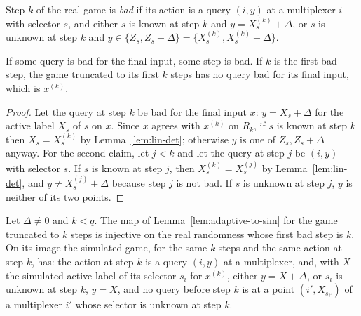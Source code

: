 \begin{definition}
  \label{def:adaptive-bad}
  \leanok
  Step $k$ of the real game is \emph{bad} if its action is a query $(i, y)$ at a multiplexer $i$
  with selector $s$, and either $s$ is known at step $k$ and $y = X^{(k)}_s + \Delta$, or $s$ is
  unknown at step $k$ and $y \in \{Z_s, Z_s + \Delta\} = \{X^{(k)}_s, X^{(k)}_s + \Delta\}$.
\end{definition}

\begin{lemma}
  \label{lem:adaptive-first-bad}
  \leanok
  If some query is bad for the final input, some step is bad. If $k$ is the first bad step, the game
  truncated to its first $k$ steps has no query bad for its final input, which is $x^{(k)}$.
\end{lemma}

\begin{proof}
  \leanok
  Let the query at step $k$ be bad for the final input $x$: $y = X_s + \Delta$ for the active label
  $X_s$ of $s$ on $x$. Since $x$ agrees with $x^{(k)}$ on $R_k$, if $s$ is known at step $k$ then
  $X_s = X^{(k)}_s$ by Lemma~\ref{lem:lin-det}; otherwise $y$ is one of $Z_s, Z_s + \Delta$ anyway.
  For the second claim, let $j < k$ and let the query at step $j$ be $(i, y)$ with selector $s$.
  If $s$ is known at step $j$, then $X^{(k)}_s = X^{(j)}_s$ by Lemma~\ref{lem:lin-det}, and $y \ne
  X^{(j)}_s + \Delta$ because step $j$ is not bad. If $s$ is unknown at step $j$, $y$ is neither of
  its two points.
\end{proof}

\begin{lemma}
  \label{lem:adaptive-bad-image}
  \leanok
  Let $\Delta \neq 0$ and $k < q$. The map of Lemma~\ref{lem:adaptive-to-sim} for the game truncated
  to $k$ steps is injective on the real randomness whose first bad step is $k$. On its image the
  simulated game, for the same $k$ steps and the same action at step $k$, has: the action at step
  $k$ is a query $(i, y)$ at a multiplexer, and, with $X$ the simulated active label of its selector
  $s_i$ for $x^{(k)}$, either $y = X + \Delta$, or $s_i$ is unknown at step $k$, $y = X$, and no
  query before step $k$ is at a point $(i', X_{s_{i'}})$ of a multiplexer $i'$ whose selector is
  unknown at step $k$.
\end{lemma}

